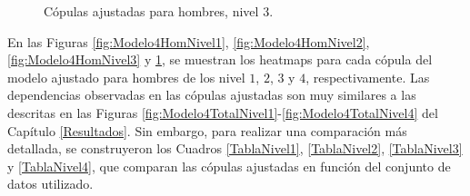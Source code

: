 \begin{figure}[H]
 \centering
    \caption{Cópulas ajustadas para hombres, nivel $3$.}
    \label{fig:Modelo4HomNivel4}
\end{figure}

En las Figuras \ref{fig:Modelo4HomNivel1}, \ref{fig:Modelo4HomNivel2}, \ref{fig:Modelo4HomNivel3} y \ref{fig:Modelo4HomNivel4}, se muestran los heatmaps para cada cópula del modelo ajustado para hombres de los nivel $1$, $2$, $3$ y $4$, respectivamente. Las dependencias observadas en las cópulas ajustadas son muy similares a las descritas en las Figuras \ref{fig:Modelo4TotalNivel1}-\ref{fig:Modelo4TotalNivel4} del Capítulo \ref{Resultados}. Sin embargo, para realizar una comparación más detallada, se construyeron los Cuadros \ref{TablaNivel1}, \ref{TablaNivel2}, \ref{TablaNivel3} y \ref{TablaNivel4}, que comparan las cópulas ajustadas en función del conjunto de datos utilizado.



